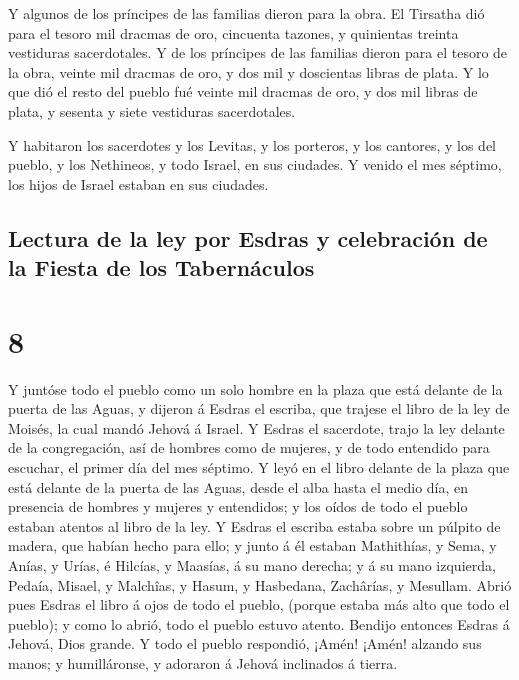  Y algunos de los príncipes de las familias dieron para
la obra. El Tirsatha dió para el tesoro mil dracmas de oro, cincuenta
tazones, y quinientas treinta vestiduras sacerdotales.  Y
de los príncipes de las familias dieron para el tesoro de la obra,
veinte mil dracmas de oro, y dos mil y doscientas libras de plata.
 Y lo que dió el resto del pueblo fué veinte mil dracmas
de oro, y dos mil libras de plata, y sesenta y siete vestiduras
sacerdotales.

 Y habitaron los sacerdotes y los Levitas, y los
porteros, y los cantores, y los del pueblo, y los Nethineos, y todo
Israel, en sus ciudades. Y venido el mes séptimo, los hijos de Israel
estaban en sus ciudades.

\hypertarget{lectura-de-la-ley-por-esdras-y-celebraciuxf3n-de-la-fiesta-de-los-tabernuxe1culos}{%
\subsection{Lectura de la ley por Esdras y celebración de la Fiesta de
los
Tabernáculos}\label{lectura-de-la-ley-por-esdras-y-celebraciuxf3n-de-la-fiesta-de-los-tabernuxe1culos}}

\hypertarget{section-7}{%
\section{8}\label{section-7}}

 Y juntóse todo el pueblo como un solo hombre en la plaza
que está delante de la puerta de las Aguas, y dijeron á Esdras el
escriba, que trajese el libro de la ley de Moisés, la cual mandó Jehová
á Israel.  Y Esdras el sacerdote, trajo la ley delante de
la congregación, así de hombres como de mujeres, y de todo entendido
para escuchar, el primer día del mes séptimo.  Y leyó en
el libro delante de la plaza que está delante de la puerta de las Aguas,
desde el alba hasta el medio día, en presencia de hombres y mujeres y
entendidos; y los oídos de todo el pueblo estaban atentos al libro de la
ley.  Y Esdras el escriba estaba sobre un púlpito de
madera, que habían hecho para ello; y junto á él estaban Mathithías, y
Sema, y Anías, y Urías, é Hilcías, y Maasías, á su mano derecha; y á su
mano izquierda, Pedaía, Misael, y Malchîas, y Hasum, y Hasbedana,
Zachârías, y Mesullam.  Abrió pues Esdras el libro á ojos
de todo el pueblo, (porque estaba más alto que todo el pueblo); y como
lo abrió, todo el pueblo estuvo atento.  Bendijo entonces
Esdras á Jehová, Dios grande. Y todo el pueblo respondió, ¡Amén! ¡Amén!
alzando sus manos; y humilláronse, y adoraron á Jehová inclinados á
tierra.

